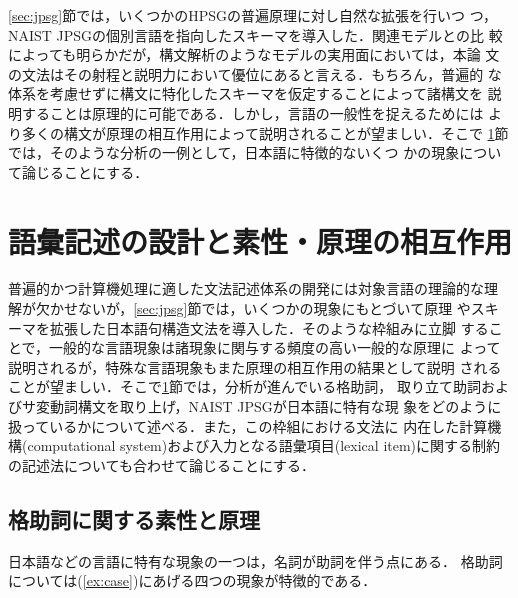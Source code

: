 \ref{sec:jpsg}節では，いくつかのHPSGの普遍原理に対し自然な拡張を行いつ
つ，NAIST JPSGの個別言語を指向したスキーマを導入した．関連モデルとの比
較によっても明らかだが，構文解析のようなモデルの実用面においては，本論
文の文法はその射程と説明力において優位にあると言える．もちろん，普遍的
な体系を考慮せずに構文に特化したスキーマを仮定することによって諸構文を
説明することは原理的に可能である．しかし，言語の一般性を捉えるためには
より多くの構文が原理の相互作用によって説明されることが望ましい．そこで
\ref{sec:jl}節では，そのような分析の一例として，日本語に特徴的ないくつ
かの現象について論じることにする．

\setcounter{section}{2}

\section{語彙記述の設計と素性・原理の相互作用}\label{sec:jl}

普遍的かつ計算機処理に適した文法記述体系の開発には対象言語の理論的な理
解が欠かせないが，\ref{sec:jpsg}節では，いくつかの現象にもとづいて原理
やスキーマを拡張した日本語句構造文法を導入した．そのような枠組みに立脚
することで，一般的な言語現象は諸現象に関与する頻度の高い一般的な原理に
よって説明されるが，特殊な言語現象もまた原理の相互作用の結果として説明
されることが望ましい．そこで\ref{sec:jl}節では，分析が進んでいる格助詞，
取り立て助詞およびサ変動詞構文を取り上げ，NAIST JPSGが日本語に特有な現
象をどのように扱っているかについて述べる．また，この枠組における文法に
内在した計算機構(computational system)および入力となる語彙項目(lexical
item)に関する制約の記述法についても合わせて論じることにする．


\subsection{格助詞に関する素性と原理}\label{sec:jl:case}
日本語などの言語に特有な現象の一つは，名詞が助詞を伴う点にある．
格助詞については(\ref{ex:case})にあげる四つの現象が特徴的である．

